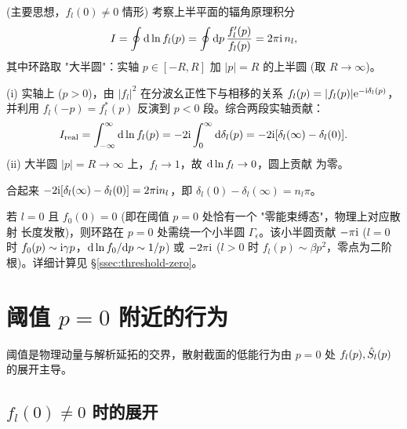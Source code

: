 \begin{proof*}\!(主要思想，$f_l(0)\neq 0$ 情形)
考察上半平面的辐角原理积分
\begin{equation}
I=\oint \mathrm{d}\ln f_l(p) = \oint \mathrm{d} p\,\frac{f_l'(p)}{f_l(p)} = 2\pi\mathrm{i}\,n_l,
\label{eq:argprinciple}
\end{equation}
其中环路取 "大半圆"：实轴 $p\in[-R,R]$ 加 $|p|=R$ 的上半圆 (取 $R\to\infty$)。

(i) 实轴上 ($p>0$)，由 $|f_l|^2$ 在分波幺正性下与相移的关系
$f_l(p)=|f_l(p)|\mathrm{e}^{-\mathrm{i}\delta_l(p)}$，并利用 $f_l(-p)=f_l^*(p)$ 反演到 $p<0$
段。综合两段实轴贡献：
\begin{equation}
I_{\text{real}}=\int_{-\infty}^\infty\mathrm{d}\ln f_l(p) = -2\mathrm{i}\int_0^\infty\mathrm{d}\delta_l(p)
=-2\mathrm{i}[\delta_l(\infty)-\delta_l(0)].
\end{equation}
(ii) 大半圆 $|p|=R\to\infty$ 上，$f_l\to 1$，故 $\mathrm{d}\ln f_l\to 0$，圆上贡献
为零。

合起来 $-2\mathrm{i}[\delta_l(\infty)-\delta_l(0)]=2\pi\mathrm{i} n_l$，即
$\delta_l(0)-\delta_l(\infty)=n_l\pi$。
\end{proof*}

\begin{remark}[$f_l(0)=0$ 例外情形]
若 $l=0$ 且 $f_0(0)=0$ (即在阈值 $p=0$ 处恰有一个 "零能束缚态"，物理上对应散射
长度发散)，则环路在 $p=0$ 处需绕一个小半圆 $\Gamma_\epsilon$。该小半圆贡献
$-\pi\mathrm{i}$ ($l=0$ 时 $f_0(p)\sim\mathrm{i}\gamma p$，$\mathrm{d}\ln f_0/\mathrm{d} p\sim 1/p$)
或 $-2\pi\mathrm{i}$ ($l>0$ 时 $f_l(p)\sim\beta p^2$，零点为二阶根)。详细计算见
\S\ref{ssec:threshold-zero}。
\end{remark}

\section{阈值 $p=0$ 附近的行为}\label{sec:threshold}

阈值是物理动量与解析延拓的交界，散射截面的低能行为由 $p=0$ 处
$f_l(p),\hat{S}_l(p)$ 的展开主导。

\subsection{$f_l(0)\neq 0$ 时的展开}\label{ssec:threshold-nonzero}

